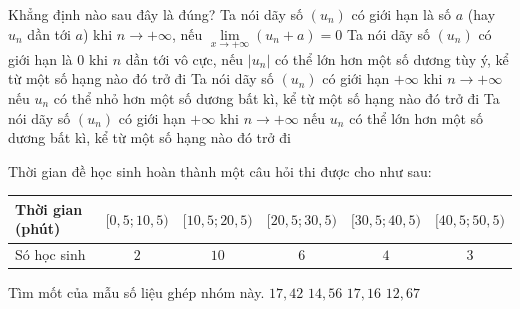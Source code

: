 \begin{ex} %
	Khẳng định nào sau đây là đúng?
	\choice
	{Ta nói dãy số $\left(u_n \right)$ có giới hạn là số $a$ (hay $u_n$ dần tới $a$) khi $n \to +\infty$, nếu $\underset{x \to +\infty}{\lim}{\left(u_n + a \right)} = 0$}
	{Ta nói dãy số $\left(u_n \right)$ có giới hạn là $0$ khi $n$ dần tới vô cực, nếu $\left|u_n \right|$ có thể lớn hơn một số dương tùy ý, kể từ một số hạng nào đó trở đi}
	{Ta nói dãy số $\left( {{u}_{n}} \right)$ có giới hạn $+\infty $ khi $n\to +\infty $ nếu ${{u}_{n}}$ có thể nhỏ hơn một số dương bất kì, kể từ một số hạng nào đó trở đi}
	{\True Ta nói dãy số $\left( {{u}_{n}} \right)$ có giới hạn $+\infty $ khi $n\to +\infty $ nếu ${{u}_{n}}$ có thể lớn hơn một số dương bất kì, kể từ một số hạng nào đó trở đi}
\end{ex}

\begin{ex}%
	Thời gian đề học sinh hoàn thành một câu hỏi thi được cho như sau:
	\begin{center}
		\begin{tabular}{|l|c|c|c|c|c|}
			\hline
			Thời gian (phút) & {$[0{,}5; 10{,}5)$} & {$[10{,}5; 20{,}5)$} & {$[20{,}5; 30{,}5)$} & {$[30{,}5; 40{,}5)$} & {$[40{,}5; 50{,}5)$} \\
			\hline
			Só học sinh      & $2$                 & $10$                 & $6$                  & $4$                  & $3$                  \\
			\hline
		\end{tabular}
	\end{center}
	Tìm mốt của mẫu số liệu ghép nhóm này.
	\choice
	{$17{,}42$}
	{$14{,}56$}
	{\True $17{,}16$}
	{$12{,}67$}
\end{ex}

